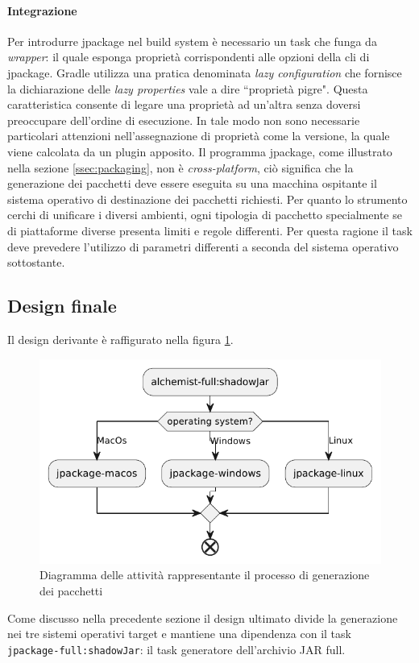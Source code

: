 \paragraph{Integrazione} Per introdurre jpackage nel build system è necessario un task che funga da \textit{wrapper}: il quale esponga proprietà corrispondenti alle opzioni della \ac{cli} di jpackage. Gradle utilizza una pratica denominata \textit{lazy configuration} che fornisce la dichiarazione delle \textit{lazy properties} vale a dire ``proprietà pigre". Questa caratteristica consente di legare una proprietà ad un'altra senza doversi preoccupare dell'ordine di esecuzione. In tale modo non sono necessarie particolari attenzioni nell'assegnazione di proprietà come la versione, la quale viene calcolata da un plugin apposito. Il programma jpackage, come illustrato nella sezione \ref{ssec:packaging}, non è \textit{cross-platform}, ciò significa che la generazione dei pacchetti deve essere eseguita su una macchina ospitante il sistema operativo di destinazione dei pacchetti richiesti. Per quanto lo strumento cerchi di unificare i diversi ambienti, ogni tipologia di pacchetto specialmente se di piattaforme diverse presenta limiti e regole differenti. Per questa ragione il task deve prevedere l'utilizzo di parametri differenti a seconda del sistema operativo sottostante.

\subsection{Design finale} Il design derivante è raffigurato nella figura \ref{fig:gradle-jpackage-scheme}. 

\begin{figure}[htb]
	\centering
	\includegraphics[width=.8\linewidth]{figures/gradle-jpackage-scheme.pdf}
	\caption{Diagramma delle attività rappresentante il processo di generazione dei pacchetti}
	\label{fig:gradle-jpackage-scheme}
\end{figure}
\noindent Come discusso nella precedente sezione il design ultimato divide la generazione nei tre sistemi operativi target e mantiene una dipendenza con il task \\ \texttt{jpackage-full:shadowJar}: il task generatore dell'archivio JAR full.

